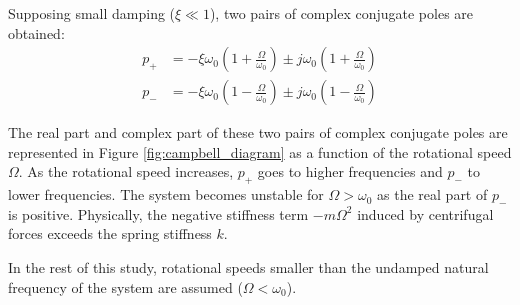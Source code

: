 \documentclass{ISMA_USD2020}
\begin{document}
Supposing small damping (\(\xi \ll 1\)), two pairs of complex conjugate poles are obtained:
\begin{subequations}
\label{eq:pole_values}
  \begin{align}
    p_{+} &= - \xi \omega_0 \left( 1 + \frac{\Omega}{\omega_0} \right) \pm j \omega_0 \left( 1 + \frac{\Omega}{\omega_0} \right) \\
    p_{-} &= - \xi \omega_0 \left( 1 - \frac{\Omega}{\omega_0} \right) \pm j \omega_0 \left( 1 - \frac{\Omega}{\omega_0} \right)
  \end{align}
\end{subequations}

The real part and complex part of these two pairs of complex conjugate poles are represented in Figure \ref{fig:campbell_diagram} as a function of the rotational speed \(\Omega\).
As the rotational speed increases, \(p_{+}\) goes to higher frequencies and \(p_{-}\) to lower frequencies.
The system becomes unstable for \(\Omega > \omega_0\) as the real part of \(p_{-}\) is positive.
Physically, the negative stiffness term \(-m\Omega^2\) induced by centrifugal forces exceeds the spring stiffness \(k\).

In the rest of this study, rotational speeds smaller than the undamped natural frequency of the system are assumed (\(\Omega < \omega_0\)).
\end{document}
